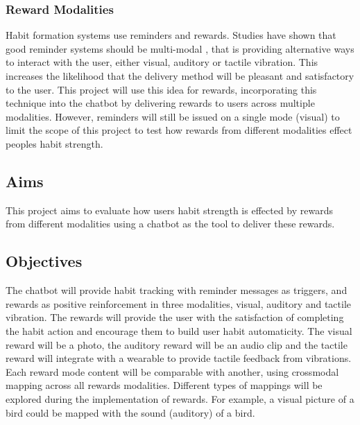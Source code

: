 \subsubsection*{Reward Modalities}
Habit formation systems use reminders and rewards. Studies have shown that good reminder systems should be multi-modal \cite{article_designing_multimodal_reminders_for_home}, that is providing alternative ways to interact with the user, either visual, auditory or tactile vibration. This increases the likelihood that the delivery method will be pleasant and satisfactory to the user. This project will use this idea for rewards, incorporating this technique into the chatbot by delivering rewards to users across multiple modalities. However, reminders will still be issued on a single mode (visual) to limit the scope of this project to test how rewards from different modalities effect peoples habit strength.

\subsection*{Aims}
This project aims to evaluate how users habit strength is effected by rewards from different modalities using a chatbot as the tool to deliver these rewards.

\subsection*{Objectives}
The chatbot will provide habit tracking with reminder messages as triggers, and rewards as positive reinforcement in three modalities, visual, auditory and tactile vibration.\newline
\newline
The rewards will provide the user with the satisfaction of completing the habit action and encourage them to build user habit automaticity. The visual reward will be a photo, the auditory reward will be an audio clip and the tactile reward will integrate with a wearable to provide tactile feedback from vibrations. Each reward mode content will be comparable with another, using crossmodal mapping across all rewards modalities. Different types of mappings will be explored during the implementation of rewards. For example, a visual picture of a bird could be mapped with the sound (auditory) of a bird.

